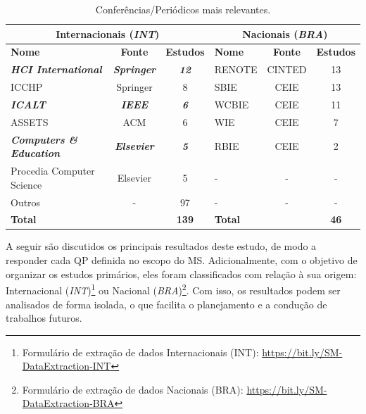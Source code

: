 \begin{table}[htbp]
\caption{Conferências/Periódicos mais relevantes.}
\label{results:table:publication-venues}
\centering
\begin{tabular}{lcc|lcc}
\hline
\multicolumn{3}{c|}{\textbf{Internacionais (\textit{INT})}} & \multicolumn{3}{c}{\textbf{Nacionais (\textit{BRA})}} \\ \hline
\textbf{Nome} & \textbf{Fonte} & \textbf{Estudos} & \textbf{Nome} & \textbf{Fonte} & \textbf{Estudos} \\ \hline
\textit{\textbf{HCI International}} & \textit{\textbf{Springer}} & \textit{\textbf{12}} & RENOTE & CINTED & 13 \\ 
ICCHP & Springer & 8 & SBIE & CEIE & 13 \\ 
\textit{\textbf{ICALT}} & \textit{\textbf{IEEE}} & \textit{\textbf{6}} & WCBIE & CEIE & 11 \\ 
ASSETS & ACM & 6 & WIE & CEIE & 7 \\ 
\textit{\textbf{Computers \& Education}} & \textit{\textbf{Elsevier}} & \textit{\textbf{5}} & RBIE & CEIE & 2 \\ 
Procedia Computer Science & Elsevier & 5 & - & - & - \\ 
Outros & - & 97 & - & - & - \\ 
\multicolumn{2}{l}{\textbf{Total}} & \textbf{139} & \multicolumn{2}{l}{\textbf{Total}} & \textbf{46} \\ \hline
\end{tabular}
\end{table}

A seguir são discutidos os principais resultados deste estudo, de modo a responder cada QP definida no escopo do MS. Adicionalmente, com o objetivo de organizar os estudos primários, eles foram classificados com relação à sua origem: Internacional (\textit{INT})\footnote{Formulário de extração de dados Internacionais (INT): \url{https://bit.ly/SM-DataExtraction-INT}} ou Nacional (\textit{BRA})\footnote{Formulário de extração de dados Nacionais (BRA): \url{https://bit.ly/SM-DataExtraction-BRA}}. Com isso, os resultados podem ser analisados de forma isolada, o que facilita o planejamento e a condução de trabalhos futuros.

